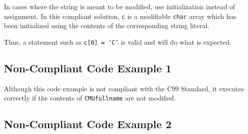    In cases where the string is meant to be modified, use initialization instead of assignment. In this compliant solution, {\tt c} is a modifiable {\tt char} array which has been initialized using the contents of the corresponding string literal.


   Thus, a statement such as {\tt c[0] = 'C'} is valid and will do what is expected.
   \subsection{Non-Compliant Code Example 1}

   Although this code example is not compliant with the C99 Standard, it executes correctly if the contents of {\tt CMUfullname} are not modified.

   \subsection{Non-Compliant Code Example 2}

